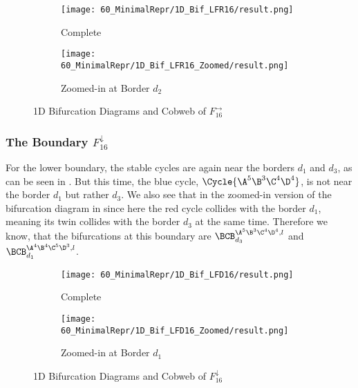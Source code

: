\begin{figure}
    \centering
    \begin{subfigure}{0.4\textwidth}
        \centering
        \texttt{[image: 60\_MinimalRepr/1D\_Bif\_LFR16/result.png]}
        \caption{Complete}
        \label{fig:final.bifurcation.F.right}
    \end{subfigure}
    \begin{subfigure}{0.4\textwidth}
        \centering
        \texttt{[image: 60\_MinimalRepr/1D\_Bif\_LFR16\_Zoomed/result.png]}
        \caption{Zoomed-in at Border $d_2$}
        \label{fig:final.bifurcation.F.right.zoomed}
    \end{subfigure}
    \caption{1D Bifurcation Diagrams and Cobweb of $F_{16}^\rightarrow$}
\end{figure}

\subsubsection{The Boundary $F_{16}^\downarrow$}

For the lower boundary, the stable cycles are again near the borders $d_1$ and $d_3$, as can be seen in .
But this time, the blue cycle, $\Cycle{\A^5\B^3\C^4\D^4}$, is not near the border $d_1$ but rather $d_3$.
We also see that in the zoomed-in version of the bifurcation diagram in  since here the red cycle collides with the border $d_1$, meaning its twin collides with the border $d_3$ at the same time.
Therefore we know, that the bifurcations at this boundary are $\BCB_{d_3}^{\A^5\B^3\C^4\D^4, l}$ and $\BCB_{d_1}^{\A^4\B^4\C^5\D^3, l}$.

\begin{figure}
    \centering
    \begin{subfigure}{0.4\textwidth}
        \centering
        \texttt{[image: 60\_MinimalRepr/1D\_Bif\_LFD16/result.png]}
        \caption{Complete}
        \label{fig:final.bifurcation.F.down}
    \end{subfigure}
    \begin{subfigure}{0.4\textwidth}
        \centering
        \texttt{[image: 60\_MinimalRepr/1D\_Bif\_LFD16\_Zoomed/result.png]}
        \caption{Zoomed-in at Border $d_1$}
        \label{fig:final.bifurcation.F.down.zoomed}
    \end{subfigure}
    \caption{1D Bifurcation Diagrams and Cobweb of $F_{16}^\downarrow$}
\end{figure}

